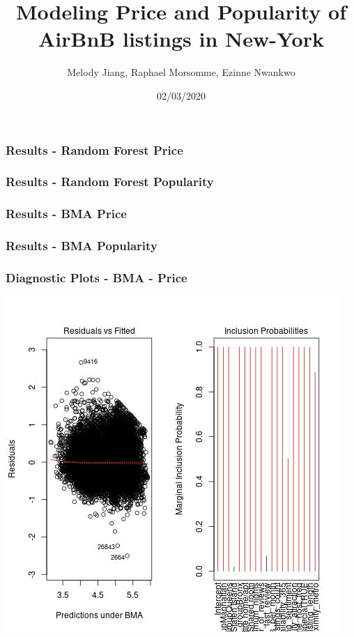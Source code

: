 \documentclass{beamer}
\title{Modeling Price and Popularity of AirBnB listings in New-York}
\author{Melody Jiang, Raphael Morsomme, Ezinne Nwankwo}
\institute{Department of Statistical Science, Duke University}
\date{02/03/2020}
\begin{document}
\frame{\titlepage}




\begin{frame}
\frametitle{Results - Random Forest Price}

\end{frame}

\begin{frame}
\frametitle{Results - Random Forest Popularity}

\end{frame}

\begin{frame}
\frametitle{Results - BMA Price}


\end{frame}

\begin{frame}
\frametitle{Results - BMA Popularity}
\begin{center}
	
\end{center}

\end{frame}


\begin{frame}
\frametitle{Diagnostic Plots - BMA - Price}
\begin{center}
	\includegraphics[scale = 0.5]{diagnostics_price_bma.jpeg}	
\end{center}
\end{frame}
\end{document}
